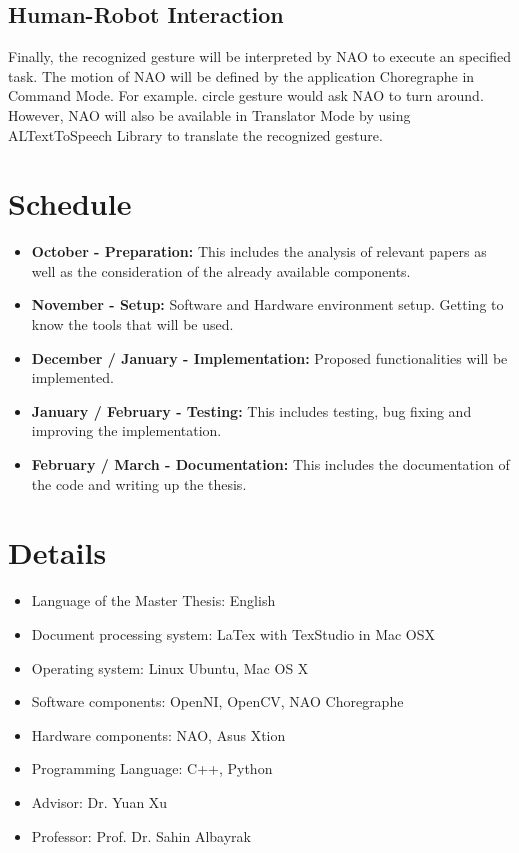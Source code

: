 \section{Human-Robot Interaction}
Finally, the recognized gesture will be interpreted by NAO to execute an specified task. The motion of NAO will be defined by the application Choregraphe in Command Mode. For example. circle gesture would ask NAO to turn around. However, NAO will also be available in Translator Mode by using ALTextToSpeech Library to translate the recognized gesture.


\chapter{Schedule}
\begin{itemize}
	\item \textbf{October - Preparation:} This includes the analysis of relevant papers as well as the consideration of the already available components.
	\item \textbf{November - Setup:} Software and Hardware environment setup. Getting to know the tools that will be used.
	\item \textbf{December / January - Implementation:} Proposed functionalities will be implemented.
	\item \textbf{January / February - Testing:} This includes testing, bug fixing and improving the implementation.
	\item \textbf{February / March - Documentation:} This includes the documentation of the code and writing up the thesis.
\end{itemize}

\chapter{Details}
\begin{itemize}
	\item Language of the Master Thesis: English
	\item Document processing system: LaTex with TexStudio in Mac OSX
	\item Operating system: Linux Ubuntu, Mac OS X
	\item Software components: OpenNI, OpenCV, NAO Choregraphe
	\item Hardware components: NAO, Asus Xtion
	\item Programming Language: C++, Python
	\item Advisor: Dr. Yuan Xu
	\item Professor: Prof. Dr. Sahin Albayrak
\end{itemize}
